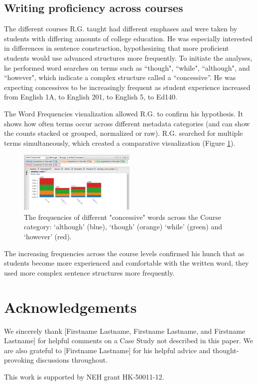 \documentclass{sig-alternate}
\begin{document}
\subsection{Writing proficiency across courses}
The different courses R.G. taught had different emphases and were taken by students with differing amounts of college education. He was especially interested in differences in sentence construction, hypothesizing that more proficient students would use advanced structures more frequently. To initiate the analyses, he performed word searches on terms such as ``though", ``while", ``although", and ``however", which indicate a complex structure called a ``concessive''. He was expecting concessives to be increasingly frequent as student experience increased from English 1A, to English 201, to English 5, to Ed140.

The Word Frequencies visualization allowed R.G. to confirm his hypothesis. It shows how often terms occur across different metadata categories (and can show the counts stacked or grouped, normalized or raw). R.G. searched for multiple terms simultaneously, which created a comparative visualization (Figure \ref{fig:rex05}).
\begin{figure}[h!]
\includegraphics[width=0.5\textwidth]{fig/rex/05.png}
\caption{The frequencies of different "concessive" words across the Course category: `although' (blue), `though' (orange) `while' (green) and `however' (red). \label{fig:rex05}}
\end{figure}
The increasing frequencies across the course levels confirmed his hunch that as students become more experienced and comfortable with the written word, they used more complex sentence structures more frequently. 




\section{Acknowledgements}
We sincerely thank [Firstname Lastname, Firstname Lastname, and Firstname Lastname] for helpful comments on a Case Study not described in this paper. We are also grateful to [Firstname Lastname] for his helpful advice and thought-provoking discussions throughout.

This work is supported by NEH grant HK-50011-12.


 
  
\end{document}
